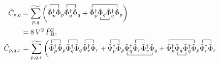 \begin{align}\label{eq:CEP_firstOrder_twoLoop_withDetAndLambda_6}
 \tilde C_{p,q} & = \widetilde{\sum\limits_{p,q}} \left( 
                     \contraction{}{\tilde\Phi}{{}_{p}^{\dagger}}{\tilde\Phi}
                     \contraction{\tilde\Phi_{p}^{\dagger} \tilde\Phi_{p}}{\tilde\Phi}{{}_{q}^{\dagger}}{\tilde\Phi}
                     \tilde\Phi_{p}^{\dagger} \tilde\Phi_{p} \tilde\Phi_{q}^{\dagger} \tilde\Phi_{q} 
                   + \contraction{}{\tilde\Phi}{^{\dagger} \tilde\Phi_{q} \tilde\Phi_{q}^{\dagger} }{\tilde\Phi}
                     \bcontraction{\tilde\Phi_{p}^{\dagger}}{\tilde\Phi}{{}_{q}}{\tilde\Phi}
                     \tilde\Phi_{p}^{\dagger} \tilde\Phi_{q} \tilde\Phi_{q}^{\dagger} \tilde\Phi_{p}
                     \right) 
        \nonumber \\
                & = 8\, V^2\, \tilde P_B^2,
        \\\label{eq:CEP_firstOrder_threeLoop_withDetAndLambda_6}
 \tilde C_{p,q,r} & = \widetilde{\sum\limits_{p,q,r}} \left( 
                     \contraction{}{ \tilde\Phi}{{}_{p}^{\dagger} }{\tilde\Phi}
                     \contraction{\tilde\Phi_{p}^{\dagger} \tilde\Phi_{p}}{ \tilde\Phi}{{}_{q}^{\dagger} }{\tilde\Phi}
                     \contraction{\tilde\Phi_{p}^{\dagger} \tilde\Phi_{p}\tilde\Phi_{q}^{\dagger} \tilde\Phi_{q}}{ \tilde\Phi}{{}_{r}^{\dagger} }{\tilde\Phi}
                     \tilde\Phi_{p}^{\dagger} \tilde\Phi_{p} \tilde\Phi_{q}^{\dagger} \tilde\Phi_{q} \tilde\Phi_{r}^{\dagger} \tilde\Phi_{r} 
                   + \contraction{}{ \tilde\Phi}{ {}_{p}^{\dagger} }{ \tilde\Phi }
                     \bcontraction{ \tilde\Phi_{p}^{\dagger} \tilde\Phi_{p} }{ \tilde\Phi }{ {}^{\dagger} \tilde\Phi_{r} \tilde\Phi_{r}^{\dagger} }{\tilde\Phi }
                     \contraction{ \tilde\Phi_{p}^{\dagger} \tilde\Phi_{p} \tilde\Phi_{q}^{\dagger} }{ \tilde\Phi }{ {}_{r} }{ \tilde \Phi }
                     \tilde\Phi_{p}^{\dagger} \tilde\Phi_{p} \tilde\Phi_{q}^{\dagger} \tilde\Phi_{r} \tilde\Phi_{r}^{\dagger} \tilde\Phi_{q} 
                   + \contraction{}{ \tilde\Phi }{ {}_{p}^{\dagger} \tilde\Phi_{q} \tilde\Phi_{q}^{\dagger} }{\tilde\Phi}
                     \bcontraction{ \tilde\Phi_{p}^{\dagger} }{ \tilde\Phi }{ {}_{q} }{\tilde \Phi}
                     \contraction{ \tilde\Phi_{p}^{\dagger} \tilde\Phi_{q} \tilde\Phi_{q}^{\dagger} \tilde\Phi_{p} }{ \tilde\Phi }{ {}_{r}^{\dagger} }{ \tilde\Phi }
                     \tilde\Phi_{p}^{\dagger} \tilde\Phi_{q} \tilde\Phi_{q}^{\dagger} \tilde\Phi_{p} \tilde\Phi_{r}^{\dagger} \tilde\Phi_{r} \right.

\end{align}
